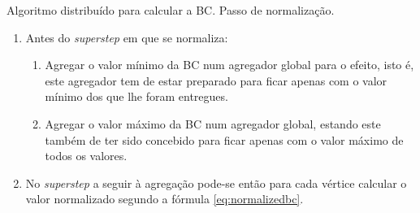 \begin{algorithm}
  \caption{Algoritmo distribuído para calcular a BC. Passo de normalização.}
  \label{alg:normbc}
  \begin{enumerate} 
    \item Antes do \textit{superstep} em que se normaliza:
    \begin{enumerate}  
      \item Agregar o valor mínimo da BC num agregador global para o 
efeito, isto é, este agregador tem de estar preparado para ficar apenas com o 
valor mínimo dos que lhe foram entregues.
      \item Agregar o valor máximo da BC num agregador global, estando este 
também de ter sido concebido para ficar apenas com o valor máximo de todos os 
valores.
    \end{enumerate}
    \item No \textit{superstep} a seguir à agregação pode-se então para 
cada vértice calcular o valor normalizado segundo a fórmula 
\ref{eq:normalizedbc}.
  \end{enumerate}
\end{algorithm}



